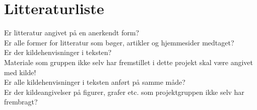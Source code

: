 \chapter{Litteraturliste}
Er litteratur angivet på en anerkendt form? \\
Er alle former for litteratur som bøger, artikler og hjemmesider medtaget? \\
Er der kildehenvisninger i teksten? \\
Materiale som gruppen ikke selv har fremstillet i dette projekt skal være angivet med kilde! \\
Er alle kildehenvisninger i teksten anført på samme måde? \\
Er der kildeangivelser på figurer, grafer etc. som projektgruppen ikke selv har frembragt? \\